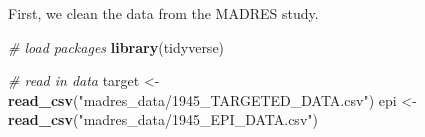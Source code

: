 \documentclass[12pt, twoside]{amherstthesis}
\newenvironment{Shaded}{\begin{snugshade}}{\end{snugshade}}
\newcommand{\CommentTok}[1]{\textcolor[rgb]{0.56,0.35,0.01}{\textit{#1}}}
\newcommand{\FunctionTok}[1]{\textcolor[rgb]{0.13,0.29,0.53}{\textbf{#1}}}
\newcommand{\NormalTok}[1]{#1}
\newcommand{\OtherTok}[1]{\textcolor[rgb]{0.56,0.35,0.01}{#1}}
\newcommand{\StringTok}[1]{\textcolor[rgb]{0.31,0.60,0.02}{#1}}
\begin{document}
First, we clean the data from the MADRES study.
\begin{Shaded}
\begin{Highlighting}[]
\CommentTok{\# load packages}
\FunctionTok{library}\NormalTok{(tidyverse)}
\end{Highlighting}
\end{Shaded}
\begin{Shaded}
\begin{Highlighting}[]
\CommentTok{\# read in data}
\NormalTok{target }\OtherTok{\textless{}{-}} \FunctionTok{read\_csv}\NormalTok{(}\StringTok{"madres\_data/1945\_TARGETED\_DATA.csv"}\NormalTok{)}
\NormalTok{epi }\OtherTok{\textless{}{-}} \FunctionTok{read\_csv}\NormalTok{(}\StringTok{"madres\_data/1945\_EPI\_DATA.csv"}\NormalTok{)}
\end{Highlighting}
\end{Shaded}
\end{document}
